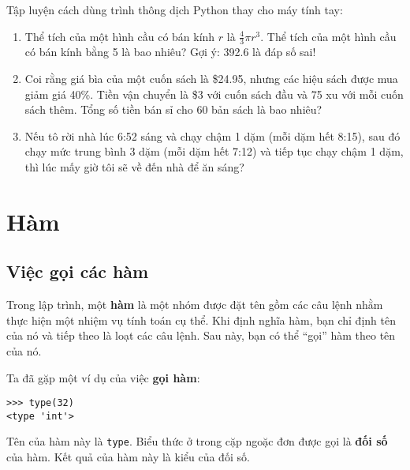 \documentclass[11pt]{book}
\begin{document}
\begin{ex}
Tập luyện cách dùng trình thông dịch Python thay cho máy tính tay:

\begin{enumerate}

\item Thể tích của một hình cầu có bán kính $r$ là $\frac{4}{3} \pi r^3$.
  Thể tích của một hình cầu có bán kính bằng 5 là bao nhiêu? Gợi ý: 392.6
  là đáp số sai!

\item Coi rằng giá bìa của một cuốn sách là \$24.95, nhưng các hiệu sách
  được mua giảm giá 40\%. Tiền vận chuyển là \$3 với cuốn sách đầu và 75 xu
  với mỗi cuốn sách thêm. Tổng số tiền bán sỉ cho 60 bản sách là bao nhiêu?

\item Nếu tô rời nhà lúc 6:52 sáng và chạy chậm 1 dặm (mỗi dặm hết 8:15),
  sau đó chạy mức trung bình 3 dặm (mỗi dặm hết 7:12) và tiếp tục chạy 
  chậm 1 dặm, thì lúc mấy giờ tôi sẽ về đến nhà để ăn sáng?

\end{enumerate}
\end{ex}



\chapter{Hàm}
\label{funcchap}

\section{Việc gọi các hàm}
\label{functionchap}

Trong lập trình, một {\bf hàm} là một nhóm được đặt tên gồm các câu lệnh 
nhằm thực hiện một nhiệm vụ tính toán cụ thể. Khi định nghĩa hàm,
bạn chỉ định tên của nó và tiếp theo là loạt các câu lệnh. Sau này,
bạn có thể ``gọi'' hàm theo tên của nó.

Ta đã gặp một ví dụ của việc {\bf gọi hàm}:

\beforeverb
\begin{verbatim}
>>> type(32)
<type 'int'>
\end{verbatim}
\afterverb
%
Tên của hàm này là {\tt type}.  Biểu thức ở trong cặp ngoặc đơn
được gọi là {\bf đối số} của hàm. Kết quả của hàm này là kiểu
của đối số.

\end{document}
